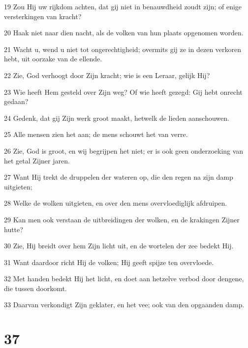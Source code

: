 \par 19 Zou Hij uw rijkdom achten, dat gij niet in benauwdheid zoudt zijn; of enige versterkingen van kracht?
\par 20 Haak niet naar dien nacht, als de volken van hun plaats opgenomen worden.
\par 21 Wacht u, wend u niet tot ongerechtigheid; overmits gij ze in dezen verkoren hebt, uit oorzake van de ellende.
\par 22 Zie, God verhoogt door Zijn kracht; wie is een Leraar, gelijk Hij?
\par 23 Wie heeft Hem gesteld over Zijn weg? Of wie heeft gezegd: Gij hebt onrecht gedaan?
\par 24 Gedenk, dat gij Zijn werk groot maakt, hetwelk de lieden aanschouwen.
\par 25 Alle mensen zien het aan; de mens schouwt het van verre.
\par 26 Zie, God is groot, en wij begrijpen het niet; er is ook geen onderzoeking van het getal Zijner jaren.
\par 27 Want Hij trekt de druppelen der wateren op, die den regen na zijn damp uitgieten;
\par 28 Welke de wolken uitgieten, en over den mens overvloediglijk afdruipen.
\par 29 Kan men ook verstaan de uitbreidingen der wolken, en de krakingen Zijner hutte?
\par 30 Zie, Hij breidt over hem Zijn licht uit, en de wortelen der zee bedekt Hij.
\par 31 Want daardoor richt Hij de volken; Hij geeft spijze ten overvloede.
\par 32 Met handen bedekt Hij het licht, en doet aan hetzelve verbod door dengene, die tussen doorkomt.
\par 33 Daarvan verkondigt Zijn geklater, en het vee; ook van den opgaanden damp.

\chapter{37}

